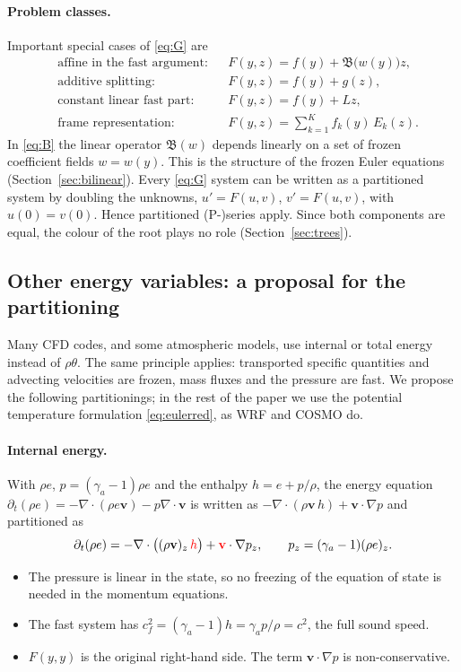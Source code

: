 \documentclass[11pt,a4paper]{article}
\theoremstyle{definition}
\theoremstyle{remark}
\begin{document}
\paragraph{Problem classes.}
Important special cases of \eqref{eq:G} are
\begin{align}
 &\text{affine in the fast argument:} && F(y,z)=f(y)+\mathfrak B\big(w(y)\big)z, \tag{$\mathcal B$}\label{eq:B}\\
 &\text{additive splitting:} && F(y,z)=f(y)+g(z), \tag{$\mathcal A$}\label{eq:A}\\
 &\text{constant linear fast part:}   && F(y,z)=f(y)+Lz, \tag{$\mathcal L$}\label{eq:L}\\
 &\text{frame representation:} && F(y,z)=\textstyle\sum_{k=1}^K f_k(y)\,E_k(z). \tag{$\mathcal F$}\label{eq:F}
\end{align}
In \eqref{eq:B} the linear operator $\mathfrak B(w)$ depends linearly on
a set of frozen coefficient fields $w=w(y)$. This is the structure of
the frozen Euler equations (Section~\ref{sec:bilinear}).
Every \eqref{eq:G} system can be written as a partitioned system by
doubling the unknowns, $u'=F(u,v)$, $v'=F(u,v)$, with $u(0)=v(0)$. Hence
partitioned (P-)series apply. Since both components are equal, the
colour of the root plays no role (Section~\ref{sec:trees}).

\subsection{Other energy variables: a proposal for the partitioning}
\label{sec:energy}

Many CFD codes, and some atmospheric models, use internal or total
energy instead of $\rho\theta$. The same principle applies: transported
specific quantities and advecting velocities are frozen, mass fluxes and
the pressure are fast. We propose the following partitionings; in the
rest of the paper we use the potential temperature formulation
\eqref{eq:eulerred}, as WRF and COSMO do.

\paragraph{Internal energy.}
With $\rho e$, $p=(\gamma_a-1)\rho e$ and the enthalpy $h=e+p/\rho$, the
energy equation $\partial_t(\rho e)=-\nabla\cdot(\rho e\mathbf v)-p\nabla\cdot\mathbf v$
is written as $-\nabla\cdot(\rho\mathbf v\,h)+\mathbf v\cdot\nabla p$
and partitioned as
\begin{equation*}
 \partial_t(\rho e)=-\nabla\cdot\big((\rho\mathbf v)_z\,\textcolor{red}{h}\big)
   +\textcolor{red}{\mathbf v}\cdot\nabla p_z,
 \qquad p_z=(\gamma_a-1)(\rho e)_z .
\end{equation*}
\begin{itemize}
\item The pressure is linear in the state, so no freezing of the
  equation of state is needed in the momentum equations.
\item The fast system has $c_f^2=(\gamma_a-1)h=\gamma_ap/\rho=c^2$, the
  full sound speed.
\item $F(y,y)$ is the original right-hand side. The term
  $\mathbf v\cdot\nabla p$ is non-conservative.
\end{itemize}
\end{document}
